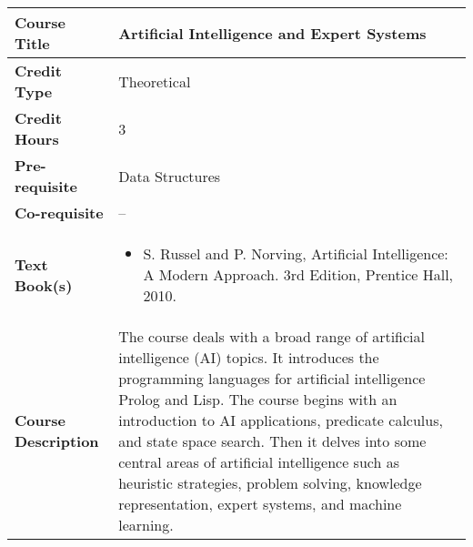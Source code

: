 \documentclass[11pt]{article}
\begin{document}
\begin{table}[h!]
\begin{tabular}{|l|l|}
\hline
\textbf{Course Title}       &   Artificial Intelligence and Expert Systems\\ \hline
\textbf{Credit Type}        &  Theoretical \\ \hline
\textbf{Credit Hours}       &  3 \\ \hline
\textbf{Pre-requisite}       & Data Structures \\ \hline
\textbf{Co-requisite}       & -- \\ \hline
\textbf{Text Book(s)}       & \begin{minipage}{.70\textwidth}
\begin{itemize} \itemsep-0.4em
	\vspace{3mm}
	\item S. Russel and P. Norving, Artificial Intelligence: A Modern Approach. 3rd Edition, Prentice Hall, 2010.
	\vspace{3mm}
\end{itemize}
\end{minipage}\\ \hline
\textbf{Course Description} & \begin{minipage}{.70\textwidth}
\vspace{3mm}
The course deals with a broad range of artificial intelligence (AI) topics. It introduces the programming languages for artificial intelligence Prolog and Lisp. The course begins with an introduction to AI applications, predicate calculus, and state space search. Then it delves into some central areas of artificial intelligence such as heuristic strategies, problem solving, knowledge representation, expert systems, and machine learning. 
\vspace{3mm}
\end{minipage} \\ \hline
\end{tabular}
\end{table}
\end{document}
